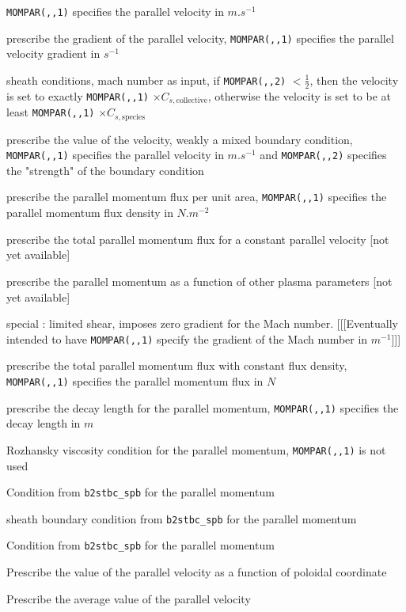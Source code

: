 \documentclass[a4paper,10pt]{report}
\begin{document}
\begin{description}
\begin{description}
  {\tt MOMPAR(,,1)} specifies the parallel velocity in $m.s^{-1}$
  \item[2] prescribe the gradient of the parallel velocity,
  {\tt MOMPAR(,,1)} specifies the parallel velocity gradient in $s^{-1}$
  \item[3] sheath conditions, mach number as input, if
  {\tt MOMPAR(,,2)} $< \frac{1}{2}$, then the velocity is set to exactly
  {\tt MOMPAR(,,1)} $\times C_{s, \mbox{collective}}$, otherwise the
  velocity is set to be at least {\tt MOMPAR(,,1)} $\times
  C_{s,\mbox{species}}$
  \item[4] prescribe the value of the velocity, weakly a mixed
  boundary condition, {\tt MOMPAR(,,1)} specifies the parallel
  velocity in $m.s^{-1}$ and {\tt MOMPAR(,,2)} specifies the
  "strength" of the boundary condition
  \item[5] prescribe the parallel momentum flux per unit area,
  {\tt MOMPAR(,,1)} specifies the parallel momentum flux density in $N.m^{-2}$
  \item[6] prescribe the total parallel momentum flux for a constant
  parallel velocity [not yet available]
  \item[7] prescribe the parallel momentum as a function of other plasma
  parameters [not yet available]
  \item[8] special : limited shear, imposes zero gradient for the Mach number.
  [[[Eventually intended to have {\tt MOMPAR(,,1)} specify the
  gradient of the Mach number in $m^{-1}$]]]
  \item[9] prescribe the total parallel momentum flux with constant flux
  density, {\tt MOMPAR(,,1)} specifies the parallel momentum flux in $N$
  \item[10] prescribe the decay length for the parallel momentum,
  {\tt MOMPAR(,,1)} specifies the decay length in $m$
  \item[11] Rozhansky viscosity condition for the parallel momentum,
  {\tt MOMPAR(,,1)} is not used
  \item[12] Condition from {\tt b2stbc\_spb} for the parallel momentum
  \item[13] sheath boundary condition from {\tt b2stbc\_spb} for the parallel momentum
  \item[14] Condition from {\tt b2stbc\_spb} for the parallel momentum
  \item[15] Prescribe the value of the parallel velocity as a function of poloidal coordinate
  \item[16] Prescribe the average value of the parallel velocity

\end{description}
\end{description}
\end{document}
